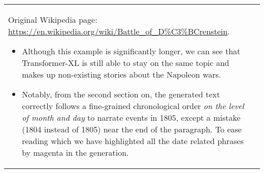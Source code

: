 \documentclass[11pt,a4paper]{article}
\newcommand{\magenta}[1]{{\color{magenta}#1}}
\begin{document}
\begin{center}
\begin{longtable}{p{7.8cm}|p{7.8cm}}
{	Original Wikipedia page: {\footnotesize \url{https://en.wikipedia.org/wiki/Battle_of_D\%C3\%BCrenstein}}. 
	\vspace{0.4em}
	
	\begin{itemize}[leftmargin=*,itemsep=0em,topsep=0.4em,parsep=0.4em]
		\item Although this example is significantly longer, we can see that Transformer-XL is still able to stay on the same topic and makes up non-existing stories about the Napoleon wars.
		\item Notably, from the second section on, the generated text correctly follows a fine-grained chronological order \textit{on the level of month and day} to narrate events in 1805, except a mistake (1804 instead of 1805) near the end of the paragraph. To ease reading which we have highlighted all the date related phrases by \magenta{magenta} in the generation.
	\end{itemize}
}
\label{tab:gen-3}
\end{longtable}
\end{center}



\FloatBarrier
 
\end{document}

